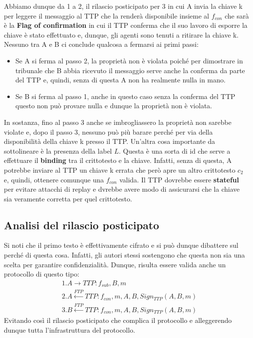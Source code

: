 Abbiamo dunque da 1 a 2, il rilascio posticipato per 3 in cui A invia la chiave k per leggere il messaggio al TTP che la renderà disponibile insieme al $f_{con}$ che sarà è la \textbf{Flag of confirmation} in cui il TTP conferma che il suo lavoro di esporre la chiave è stato effettuato e, dunque, gli agenti sono tenuti a ritirare la chiave k.
Nessuno tra A e B ci conclude qualcosa a fermarsi ai primi passi:
\begin{itemize}
    \item Se A si ferma al passo 2, la proprietà non è violata poiché per dimostrare in tribunale che B abbia ricevuto il messaggio serve anche la conferma da parte del TTP e, quindi, senza di questa A non ha realmente nulla in mano.
    \item Se B si ferma al passo 1, anche in questo caso senza la conferma del TTP questo non può provare nulla e dunque la proprietà non è violata.
\end{itemize}
In sostanza, fino al passo 3 anche se imbrogliassero la proprietà non sarebbe violate e, dopo il passo 3, nessuno può più barare perché per via della disponibilità della chiave k presso il TTP.
Un'altra cosa importante da sottolineare è la presenza della label $L$. Questa è una sorta di id che serve a effettuare il \textbf{binding} tra il crittotesto e la chiave. Infatti, senza di questa, A potrebbe inviare al TTP un chiave k errata che però apre un altro crittotesto $c_2$ e, quindi, ottenere comunque una $f_{con}$ valida.
Il TTP dovrebbe essere \textbf{stateful} per evitare attacchi di replay e dvrebbe avere modo di assicurarsi che la chiave sia veramente corretta per quel crittotesto. 
\subsection{Analisi del rilascio posticipato}
Si noti che il primo testo è effettivamente cifrato e si può dunque dibattere sul perché di questa cosa. Infatti, gli autori stessi sostengono che questa non sia una scelta per garantire confidenzialità. Dunque, risulta essere valida anche un protocollo di questo tipo:
\begin{align*}
    &1. A \to TTP: f_{sub}, B, m\\
    &2. A \xleftarrow{FTP} TTP: f_{con},m,A,B,Sign_{TTP}(A,B,m)\\
    &3. B \xleftarrow{FTP} TTP: f_{con},m,A,B,Sign_{TTP}(A,B,m)
\end{align*}
Evitando così il rilascio posticipato che complica il protocollo e alleggerendo dunque tutta l'infrastruttura del protocollo. 
